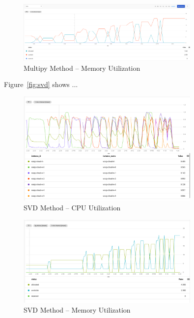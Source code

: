 \documentclass{prog_report}
\begin{document}
\begin{figure}[h]
    \centering
    \includegraphics[width=0.8\textwidth]{img/multiply-memory}
    \caption{Multipy Method – Memory Utilization}
    \label{fig:multiply-mem}
\end{figure}


Figure~\ref{fig:svd} shows ...

\begin{figure}[h]
    \centering
    \includegraphics[width=0.8\textwidth]{img/svd-cpu}
    \caption{SVD Method – CPU Utilization}
    \label{fig:svd-cpu}
\end{figure}

\begin{figure}[h]
    \centering
    \includegraphics[width=0.8\textwidth]{img/svd-memory}
    \caption{SVD Method – Memory Utilization}
    \label{fig:svd-mem}
\end{figure}
\end{document}
